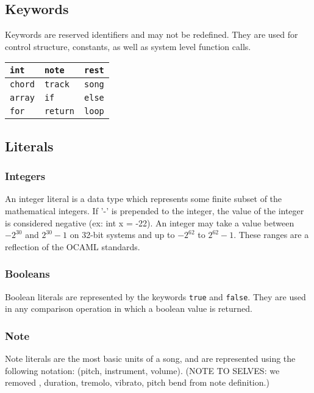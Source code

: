 \documentclass[letterpaper]{article}
\begin{document}
\begin{samepage}
\subsection{Keywords}
Keywords are reserved identifiers and may not be redefined. They are used for control structure, constants, as well as system level function calls.
\begin{table}[H]
\centering
\begin{tabularx}{.75\textwidth}{|X|X|X|}
\hline
\texttt{int} & \texttt{note} & \texttt{rest} \\
\hline
\texttt{chord} & \texttt{track} & \texttt{song} \\
\hline
\texttt{array} &  \texttt{if} & \texttt{else} \\
\hline
\texttt{for} &  \texttt{return} & \texttt{loop} \\
\hline
\end{tabularx}
\end{table}
\end{samepage}

\subsection{Literals}
\subsubsection{Integers}
An integer literal is a data type which represents some finite subset of the mathematical integers. If '-' is prepended to the integer, the value of the integer is considered negative (ex: int x = -22). An integer may take a value between $−2^{30}$ and $2^{30}−1$ on 32-bit systems and up to $−2^{62}$ to $2^{62}−1$. These ranges are a reflection of the OCAML standards.
\subsubsection{Booleans}
Boolean literals are represented by the keywords \texttt{true} and \texttt{false}. They are used in any comparison operation in which a boolean value is returned.
\subsubsection{Note}
Note literals are the most basic units of a song, and are represented using the following notation: (pitch, instrument, volume). (NOTE TO SELVES: we removed , duration, tremolo, vibrato, pitch bend from note definition.)
\end{document}
